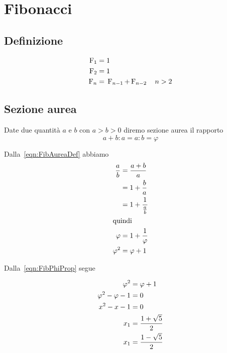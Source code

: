 \chapter{Fibonacci}
\section{Definizione}
\begin{defn}
	\begin{align}
		\operatorname{F}_{1}={}&1\notag\\
		\operatorname{F}_{2}={}&1\notag\\
		\operatorname{F}_{n}={}&\operatorname{F}_{n-1}+\operatorname{F}_{n-2}\quad n>2\label{eqn:Fibodef}
	\end{align}
\end{defn}
\section{Sezione aurea}
\begin{defn}
	Date due quantità $a$ e $b$ con $a>b>0$ diremo sezione aurea il rapporto
	\begin{equation}
	a+b:a=a:b=\varphi	
	\end{equation}\label{eqn:FibAureaDef}
\end{defn}
\begin{prop}
	Dalla~\vref{eqn:FibAureaDef} abbiamo
	\begin{align}
		\dfrac{a}{b}={}&\dfrac{a+b}{a}\notag\\
		={}&1+\dfrac{b}{a}\notag\\
		={}&1+\dfrac{1}{\frac{a}{b}}\notag\\
		\intertext{quindi}
		\varphi={}&1+\dfrac{1}{\varphi}\label{eqn:FibPhiProp}\\
		\varphi^2={}&\varphi+1\notag
	\end{align}
\end{prop}
	Dalla~\vref{eqn:FibPhiProp} segue
	\begin{prop}
	\begin{align}
		\varphi^2={}&\varphi+1\notag\\
		\varphi^2-\varphi-1={}&0\notag\\
		x^2-x-1={}&0\label{eqn:FibValPhiEqua}\\
		x_1={}&\dfrac{1+\sqrt{5}}{2}\label{eqn:FibValPhi}\\
		x_1={}&\dfrac{1-\sqrt{5}}{2}\notag
	\end{align}
\end{prop}
